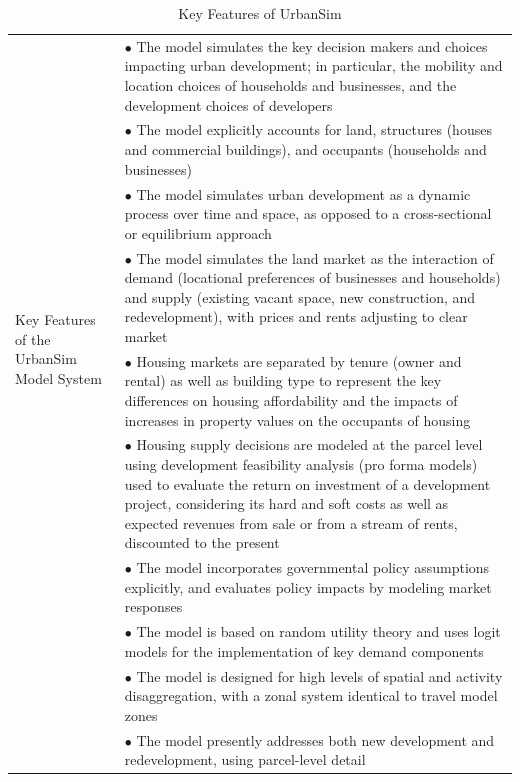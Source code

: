 \begin{table}[htp]
\caption{Key Features of UrbanSim}
\label{tab:key-features}
\begin{center}
\begin{tabular}{ p{1.5in}  p{4.4in}  }
\toprule[1.5pt]
\multirow{8}{1.5in}{Key Features of the UrbanSim
Model System} &  $\bullet$   The model simulates the key decision makers and
choices impacting urban development; in particular, the mobility and
location choices of households and businesses, and the development
choices of developers\\
&  $\bullet$   The model explicitly accounts for land, structures (houses and commercial buildings), and occupants (households and businesses)\\
&  $\bullet$   The model simulates urban development as a dynamic process over time and space, as opposed to a cross-sectional or equilibrium approach\\
&  $\bullet$   The model simulates the land market as the interaction of demand (locational preferences of businesses and households) and supply (existing vacant space, new construction, and redevelopment), with prices and rents adjusting to clear market\\
&  $\bullet$   Housing markets are separated by tenure (owner and rental) as well as building type to represent the key differences on housing affordability and the impacts of increases in property values on the occupants of housing\\
&  $\bullet$   Housing supply decisions are modeled at the parcel level using development feasibility analysis (pro forma models) used to evaluate the return on investment of a development project, considering its hard and soft costs as well as expected revenues from sale or from a stream of rents, discounted to the present\\
& $\bullet$    The model incorporates governmental policy assumptions explicitly, and evaluates policy impacts by modeling market responses\\
& $\bullet$    The model is based on random utility theory and uses logit models for the implementation of key demand components\\
& $\bullet$    The model is designed for high levels of spatial and activity disaggregation, with a zonal system identical to travel model zones\\
& $\bullet$    The model presently addresses both new development and redevelopment, using parcel-level detail\\

\end{tabular}
\end{center}
\end{table}
